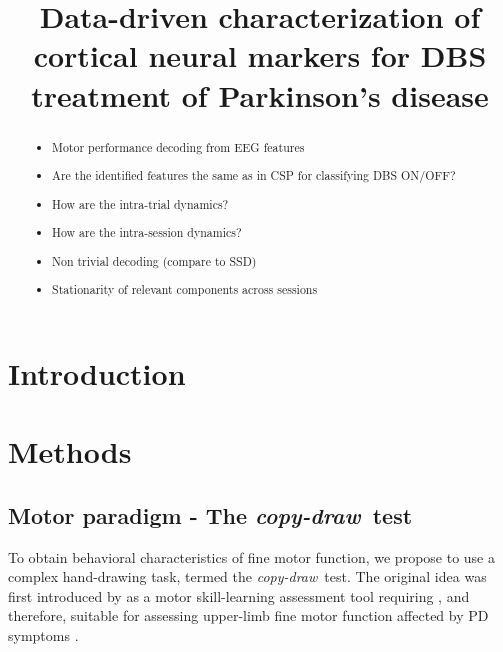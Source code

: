 \documentclass[10pt,a4paper, twocolumn]{article}
\title{Data-driven characterization of cortical neural markers for DBS treatment of Parkinson's disease}
\newcommand{\cpdt}[0]{\textit{copy-draw}~test\xspace}
\begin{document}
\maketitle
\listoftodos

\begin{abstract}

\begin{itemize}
\item Motor performance decoding from EEG features
\item Are the identified features the same as in CSP for classifying DBS ON/OFF?
\item How are the intra-trial dynamics?
\item How are the intra-session dynamics?
\item Non trivial decoding (compare to SSD)
\item Stationarity of relevant components across sessions
\end{itemize}
\end{abstract}

\section{Introduction}

\section{Methods}
\subsection{Motor paradigm - The \cpdt}\label{sec:copydraw}
To obtain behavioral characteristics of fine motor function, we propose to use a complex hand-drawing task, termed the \cpdt. The original idea was first introduced by \cite{prichard2014effects} as a motor \mbox{skill-learning} assessment tool requiring , and therefore, suitable for assessing upper-limb fine motor function affected by PD symptoms \cite{teulings1997parkinsonism, sadikov2017spirography, zham2017distinguishing}.
\end{document}
